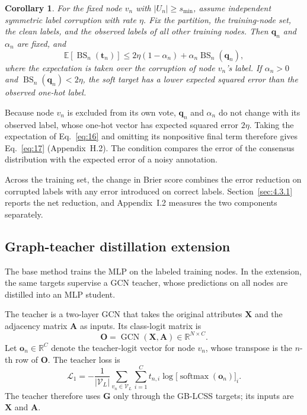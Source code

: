 \documentclass[a4paper,fleqn]{cas-sc}
\theoremstyle{definition}
\theoremstyle{plain}
\newtheorem{corollary}{Corollary}
\begin{document}
\begin{corollary}\label{cor:expected}
For the fixed node \(v_n\) with \(|U_n|\geq s_{\min}\), assume independent symmetric label corruption with rate \(\eta\). Fix the partition, the training-node set, the clean labels, and the observed labels of all other training nodes. Then \(\mathbf q_n\) and \(\alpha_n\) are fixed, and
\begin{equation}\label{eq:17}
\mathbb E[\operatorname{BS}_n(\mathbf t_n)]\leq2\eta(1-\alpha_n)+\alpha_n\operatorname{BS}_n(\mathbf q_n),
\end{equation}
where the expectation is taken over the corruption of node \(v_n\)'s label. If \(\alpha_n>0\) and \(\operatorname{BS}_n(\mathbf q_n)<2\eta\), the soft target has a lower expected squared error than the observed one-hot label.
\end{corollary}

Because node \(v_n\) is excluded from its own vote, \(\mathbf q_n\) and \(\alpha_n\) do not change with its observed label, whose one-hot vector has expected squared error \(2\eta\). Taking the expectation of Eq.~\eqref{eq:16} and omitting its nonpositive final term therefore gives Eq.~\eqref{eq:17} (Appendix~H.2). The condition compares the error of the consensus distribution with the expected error of a noisy annotation.

Across the training set, the change in Brier score combines the error reduction on corrupted labels with any error introduced on correct labels. Section~\ref{sec:4.3.1} reports the net reduction, and Appendix~I.2 measures the two components separately.

\subsection{Graph-teacher distillation extension}\label{sec:3.5}

The base method trains the MLP on the labeled training nodes. In the extension, the same targets supervise a GCN teacher, whose predictions on all nodes are distilled into an MLP student.

The teacher is a two-layer GCN that takes the original attributes \(\mathbf X\) and the adjacency matrix \(\mathbf A\) as inputs. Its class-logit matrix is
\begin{equation}\label{eq:18}
\mathbf O=\operatorname{GCN}(\mathbf X,\mathbf A)\in\mathbb R^{N\times C}.
\end{equation}
Let \(\mathbf o_n\in\mathbb R^C\) denote the teacher-logit vector for node \(v_n\), whose transpose is the \(n\)-th row of \(\mathbf O\). The teacher loss is
\begin{equation}\label{eq:19}
\mathcal L_1=-\frac{1}{|\mathcal V_L|}\sum_{v_n\in\mathcal V_L}\sum_{i=1}^C t_{n,i}\log\bigl[\operatorname{softmax}(\mathbf o_n)\bigr]_i.
\end{equation}
The teacher therefore uses \(\mathbf G\) only through the GB-LCSS targets; its inputs are \(\mathbf X\) and \(\mathbf A\).
\end{document}
